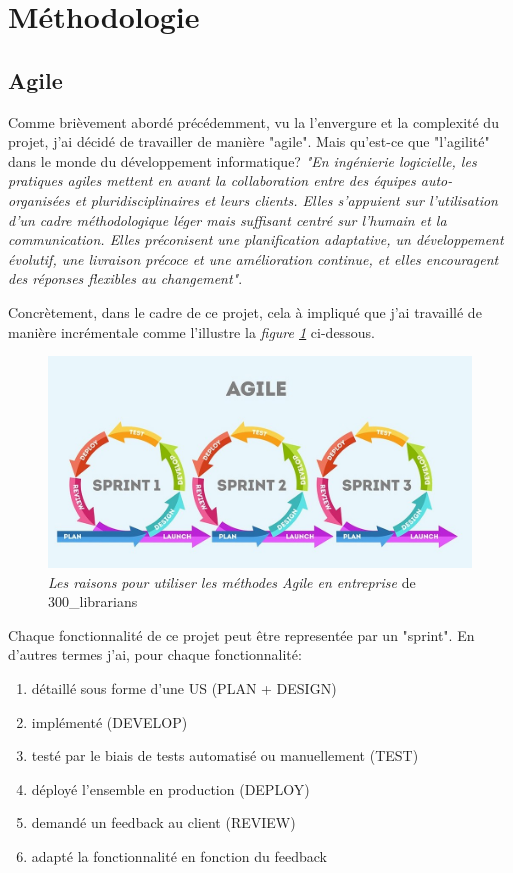 \section{Méthodologie}
\subsection{Agile}

Comme brièvement abordé précédemment, vu la l'envergure et la complexité du projet, j'ai décidé de travailler de manière "agile". Mais qu'est-ce que "l'agilité" dans le monde du développement informatique? \textit{"En ingénierie logicielle, les pratiques agiles mettent en avant la collaboration entre des équipes auto-organisées et pluridisciplinaires et leurs clients. Elles s'appuient sur l'utilisation d'un cadre méthodologique léger mais suffisant centré sur l'humain et la communication. Elles préconisent une planification adaptative, un développement évolutif, une livraison précoce et une amélioration continue, et elles encouragent des réponses flexibles au changement"\cite{Agile}}.

\newpara

Concrètement, dans le cadre de ce projet, cela à impliqué que j'ai travaillé de manière incrémentale comme l'illustre la \textit{figure \ref{agile}} ci-dessous. 
\begin{figure}[H]
  \centering
  \includegraphics[width=0.75\linewidth]{img/agile.jpeg}
  \caption{ \textit{Les raisons pour utiliser les méthodes Agile en entreprise} de 300\_librarians}
  \label{agile}
\end{figure}
Chaque fonctionnalité de ce projet peut être representée par un "sprint". En d'autres termes j'ai, pour chaque fonctionnalité: 
\begin{enumerate}
  \item détaillé sous forme d'une US (PLAN + DESIGN) 
  \item implémenté (DEVELOP)
  \item testé par le biais de tests automatisé ou manuellement (TEST)
  \item déployé l'ensemble en production (DEPLOY)
  \item demandé un feedback au client (REVIEW)
  \item adapté la fonctionnalité en fonction du feedback 
\end{enumerate} 

